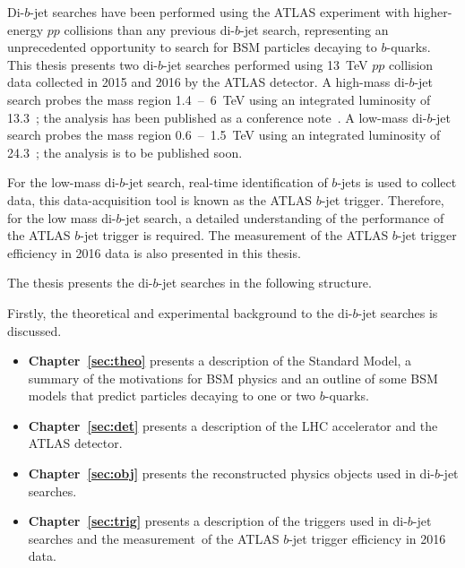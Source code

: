 Di-$b$-jet searches have been performed using the ATLAS experiment
with higher-energy $pp$ collisions than any previous \mbox{di-$b$-jet} search,
representing an unprecedented opportunity to search for BSM particles decaying to $b$-quarks.
This thesis presents two di-$b$-jet searches performed using
13~TeV $pp$ collision data collected in 2015 and 2016 by the ATLAS detector.
A high-mass di-$b$-jet search probes the mass region 1.4~--~6~TeV using an integrated luminosity of 13.3~\ifb{};
the analysis has been published as a conference note~\cite{dibjet-ichep_conf}.
A low-mass di-$b$-jet search probes the mass region 0.6~--~1.5~TeV using an integrated luminosity of 24.3~\ifb{};
the analysis is to be published soon.

For the low-mass di-$b$-jet search, real-time identification of $b$-jets is used to collect data,
this data-acquisition tool is known as the ATLAS $b$-jet trigger.
Therefore, for the low mass di-$b$-jet search, a detailed understanding of the performance of the ATLAS $b$-jet trigger is required.
The measurement of the ATLAS $b$-jet trigger efficiency in 2016 data is also presented in this thesis.

%
\noindent
The thesis presents the di-$b$-jet searches in the following structure.\vspace{-0.5em}

\noindent
Firstly, the theoretical and experimental background to the di-$b$-jet searches is discussed.
\vspace{-0.5em}
\begin{itemize}[leftmargin=*]
\item\textbf{Chapter~\ref{sec:theo}} presents a description of the Standard Model,
  a summary of the motivations for BSM physics and
  an outline of some BSM models that predict particles
  decaying to one or two $b$-quarks.%
\item\textbf{Chapter~\ref{sec:det}} presents a description of the LHC accelerator and the ATLAS detector.%
\item\textbf{Chapter~\ref{sec:obj}} presents the reconstructed physics objects used in di-$b$-jet searches. %
\item\textbf{Chapter~\ref{sec:trig}} presents a description of the triggers used in di-$b$-jet searches
  and the measurement~of the ATLAS $b$-jet trigger efficiency in 2016 data. %
\end{itemize}

